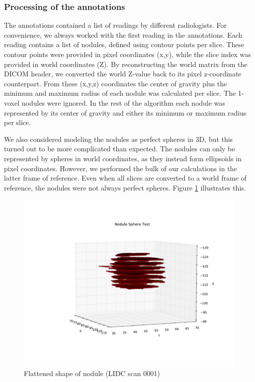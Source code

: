 \subsubsection{Processing of the annotations}
The annotations contained a list of readings by different radiologists. For
convenience, we always worked with the first reading in the annotations. Each
reading contains a list of nodules, defined using contour points per slice.
These contour points were provided in pixel coordinates (x,y), while the slice
index was provided in world coordinates (Z). By reconstructing the world matrix
from the DICOM header, we converted the world Z-value back to its pixel
z-coordinate counterpart. From these (x,y,z) coordinates the center of gravity
plus the minimum and maximum radius of each nodule was calculated per slice. The
1-voxel nodules were ignored. In the rest of the algorithm each nodule was
represented by its center of gravity and either its minimum or maximum radius
per slice.

We also considered modeling the nodules as perfect spheres in 3D, but this
turned out to be more complicated than expected. The nodules can only be
represented by spheres in world coordinates, as they instead form ellipsoids in
pixel coordinates. However, we performed the bulk of our calculations in the
latter frame of reference. Even when all slices are converted to a world frame
of reference, the nodules were not always perfect spheres. Figure
\ref{fig:flatNodule} illustrates this.

\begin{figure}[ht]
 \begin{center}
    \includegraphics[width=\linewidth, trim=150 0 0 0]{img/NoduleSphereTest_0001.pdf}
    \caption{Flattened shape of nodule (LIDC scan 0001)}
    \label{fig:flatNodule}
 \end{center}
\end{figure}

